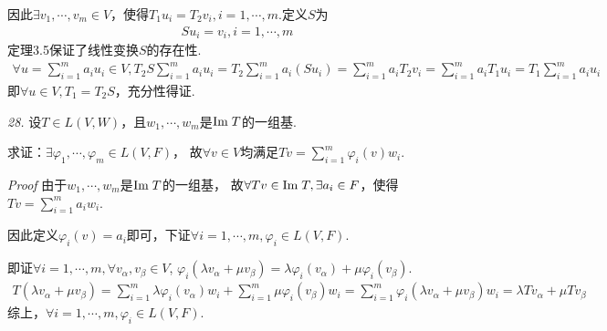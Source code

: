 因此\(\exists v_1,\cdots,v_m \in V\)，使得\(T_1u_i=T_2v_i,i=1,\cdots,m\).定义\(S\)为
    \begin{align*}
        Su_i=v_i,i=1,\cdots,m
    \end{align*}
定理3.5保证了线性变换\(S\)的存在性.
    \begin{align*}
        \forall u=\sum_{i=1}^m a_iu_i \in V,T_2S\sum_{i=1}^m a_iu_i=T_2\sum_{i=1}^m a_i(Su_i)
        =\sum_{i=1}^m a_iT_2v_i=\sum_{i=1}^m a_iT_1u_i=T_1\sum_{i=1}^m a_iu_i
    \end{align*}
即\(\forall u \in V , T_1=T_2S\)，充分性得证.

\hspace*{\fill}

\textit{28.}
设\(T \in L(V,W)\)，且\(w_1,\cdots,w_m\)是\(\mathrm{Im \;} T\)的一组基.

求证：\(\exists \varphi_1,\cdots,\varphi_m \in L(V,F)\)，
故\(\forall v \in V\)均满足\(Tv=\sum_{i=1}^m{\varphi_i(v)w_i}\).

\textit{Proof}
由于\(w_1,\cdots,w_m\)是\(\mathrm{Im \;} T\)的一组基，
故\(\forall Tv \in \mathrm{Im \;} T,\exists a_i \in F\)，使得\(Tv=\sum_{i=1}^m a_iw_i\).

因此定义\(\varphi_i(v)=a_i\)即可，下证\(\forall i=1,\cdots,m,\varphi_i \in L(V,F)\).

即证\(\forall i=1,\cdots,m,\forall v_\alpha,v_\beta \in V\),
\(\varphi_i(\lambda v_\alpha+\mu v_\beta)=\lambda \varphi_i(v_\alpha)+\mu \varphi_i(v_\beta)\).
    \begin{align*}
        T(\lambda v_\alpha+\mu v_\beta)=\sum_{i=1}^m \lambda \varphi_i(v_\alpha)w_i+\sum_{i=1}^m \mu \varphi_i(v_\beta)w_i
        =\sum_{i=1}^m \varphi_i(\lambda v_\alpha+\mu v_\beta)w_i=\lambda Tv_\alpha+\mu Tv_\beta
    \end{align*}
综上，\(\forall i=1,\cdots,m,\varphi_i \in L(V,F)\).

